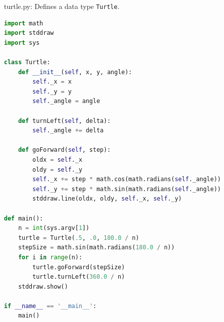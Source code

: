 \documentclass[8pt,a4paper,compress,handout]{beamer}
\begin{document}
\begin{frame}[fragile]
\begin{framed}
\tiny turtle.py: Defines a data type \lstinline{Turtle}.
\end{framed}

\begin{lstlisting}[language=Python]
import math
import stddraw
import sys

class Turtle:
    def __init__(self, x, y, angle):
        self._x = x  
        self._y = y 
        self._angle = angle  
        
    def turnLeft(self, delta):
        self._angle += delta

    def goForward(self, step):
        oldx = self._x
        oldy = self._y
        self._x += step * math.cos(math.radians(self._angle))
        self._y += step * math.sin(math.radians(self._angle))
        stddraw.line(oldx, oldy, self._x, self._y)

def main():
    n = int(sys.argv[1])
    turtle = Turtle(.5, .0, 180.0 / n)
    stepSize = math.sin(math.radians(180.0 / n))
    for i in range(n):
        turtle.goForward(stepSize)
        turtle.turnLeft(360.0 / n)
    stddraw.show()

if __name__ == '__main__':
    main()
\end{lstlisting}
\end{frame}
\end{document}
